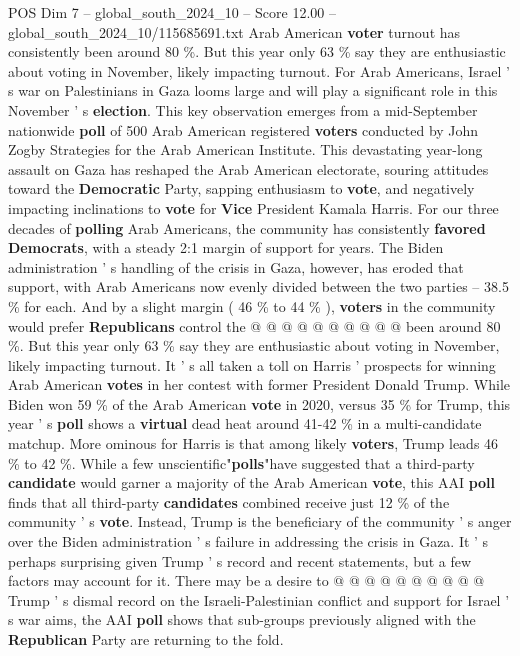 \begin{textsample}{POS Dim 7 – global\_south\_2024\_10 – Score 12.00 – global\_south\_2024\_10/115685691.txt}  \label{ex:f7_pos_217}
Arab American \textbf{voter} turnout has consistently been around 80 \%.
But this year only 63 \% say they are enthusiastic about voting in November, likely impacting turnout.
For Arab Americans, Israel ' s war on Palestinians in Gaza looms large and will play a significant role in this November ' s \textbf{election}.
This key observation emerges from a mid-September nationwide \textbf{poll} of 500 Arab American registered \textbf{voters} conducted by John Zogby Strategies for the Arab American Institute.
This devastating year-long assault on Gaza has reshaped the Arab American electorate, souring attitudes toward the \textbf{Democratic} Party, sapping enthusiasm to \textbf{vote}, and negatively impacting inclinations to \textbf{vote} for \textbf{Vice} President Kamala Harris.
For our three decades of \textbf{polling} Arab Americans, the community has consistently \textbf{favored} \textbf{Democrats}, with a steady 2:1 margin of support for years.
The Biden administration ' s handling of the crisis in Gaza, however, has eroded that support, with Arab Americans now evenly divided between the two parties -- 38.5 \% for each.
And by a slight margin ( 46 \% to 44 \% ), \textbf{voters} in the community would prefer \textbf{Republicans} control the @ @ @ @ @ @ @ @ @ @ been around 80 \%.
But this year only 63 \% say they are enthusiastic about voting in November, likely impacting turnout.
It ' s all taken a toll on Harris ' prospects for winning Arab American \textbf{votes} in her contest with former President Donald Trump.
While Biden won 59 \% of the Arab American \textbf{vote} in 2020, versus 35 \% for Trump, this year ' s \textbf{poll} shows a \textbf{virtual} dead heat around 41-42 \% in a multi-candidate matchup.
More ominous for Harris is that among likely \textbf{voters}, Trump leads 46 \% to 42 \%.
While a few unscientific"\textbf{polls}"have suggested that a third-party \textbf{candidate} would garner a majority of the Arab American \textbf{vote}, this AAI \textbf{poll} finds that all third-party \textbf{candidates} combined receive just 12 \% of the community ' s \textbf{vote}.
Instead, Trump is the beneficiary of the community ' s anger over the Biden administration ' s failure in addressing the crisis in Gaza.
It ' s perhaps surprising given Trump ' s record and recent statements, but a few factors may account for it.
There may be a desire to @ @ @ @ @ @ @ @ @ @ Trump ' s dismal record on the Israeli-Palestinian conflict and support for Israel ' s war aims, the AAI \textbf{poll} shows that sub-groups previously aligned with the \textbf{Republican} Party are returning to the fold.

\end{textsample}
